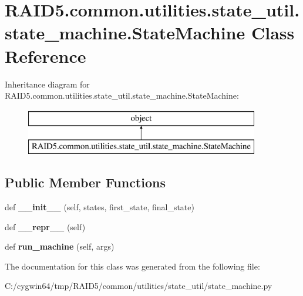 \hypertarget{class_r_a_i_d5_1_1common_1_1utilities_1_1state__util_1_1state__machine_1_1_state_machine}{}\section{R\+A\+I\+D5.\+common.\+utilities.\+state\+\_\+util.\+state\+\_\+machine.\+State\+Machine Class Reference}
\label{class_r_a_i_d5_1_1common_1_1utilities_1_1state__util_1_1state__machine_1_1_state_machine}
Inheritance diagram for R\+A\+I\+D5.\+common.\+utilities.\+state\+\_\+util.\+state\+\_\+machine.\+State\+Machine\+:\begin{figure}[H]
\begin{center}
\leavevmode
\includegraphics[height=2.000000cm]{class_r_a_i_d5_1_1common_1_1utilities_1_1state__util_1_1state__machine_1_1_state_machine}
\end{center}
\end{figure}
\subsection*{Public Member Functions}
\begin{DoxyCompactItemize}
\item 
\mbox{\label{class_r_a_i_d5_1_1common_1_1utilities_1_1state__util_1_1state__machine_1_1_state_machine_afccea2425fb87ba44df1a3adf269db95}} 
def {\bfseries \+\_\+\+\_\+init\+\_\+\+\_\+} (self, states, first\+\_\+state, final\+\_\+state)
\item 
\mbox{\label{class_r_a_i_d5_1_1common_1_1utilities_1_1state__util_1_1state__machine_1_1_state_machine_afc718a6b19996cb15e81ea6b306e0217}} 
def {\bfseries \+\_\+\+\_\+repr\+\_\+\+\_\+} (self)
\item 
\mbox{\label{class_r_a_i_d5_1_1common_1_1utilities_1_1state__util_1_1state__machine_1_1_state_machine_a327d53ef26ad8f41186b1c0ee4fe6985}} 
def {\bfseries run\+\_\+machine} (self, args)
\end{DoxyCompactItemize}


The documentation for this class was generated from the following file\+:\begin{DoxyCompactItemize}
\item 
C\+:/cygwin64/tmp/\+R\+A\+I\+D5/common/utilities/state\+\_\+util/state\+\_\+machine.\+py\end{DoxyCompactItemize}
